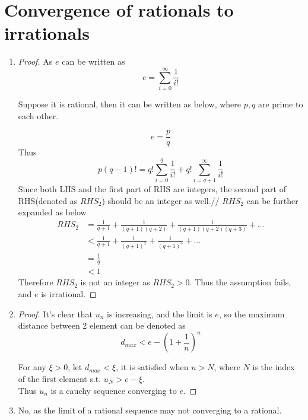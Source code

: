 \documentclass[paper=a4, fontsize=11pt]{scrartcl} %
\numberwithin{equation}{section} %
\numberwithin{figure}{section} %
\numberwithin{table}{section} %
\begin{document}
\section{Convergence of rationals to irrationals}
	\begin{enumerate}
		\item
			\begin{proof}
				As $e$ can be written as 
				\begin{equation}
					e = \sum_{i=0}^{\infty} \frac{1}{i!}
				\end{equation}
				
				Suppose it is rational, then it can be written as below, where $p, q$ are prime to each other.
				
				\begin{equation}
					e = \frac{p}{q} 
				\end{equation}
				Thus
				\begin{equation}
					p(q-1)! = q! \sum_{i=0}^{q} \frac{1}{i!} +  q! \sum_{i=q+1}^{\infty} \frac{1}{i!} 
				\end{equation}
				Since both LHS  and  the first part of RHS are integers, the second part of RHS(denoted as $RHS_2$) should be an integer as well.//
				$RHS_2$ can be further expanded as below
				\begin{equation}
					\begin{aligned}
						RHS_2 & = \frac{1}{q+1} + \frac{1}{(q+1)(q+2)} + \frac{1}{(q+1)(q+2)(q+3)} + ...\\
						           & <  \frac{1}{q+1} + \frac{1}{(q+1)^2} + \frac{1}{(q+1)^3} + ...\\
						           & = \frac{1}{q}\\
						           & < 1
					\end{aligned}
				\end{equation}
				Therefore $RHS_2$ is not an integer as $RHS_2 > 0$. Thus the assumption fails, and $e$  is irrational.
			\end{proof}
	
		\item
			\begin{proof}
				It's clear that $u_n$ is increasing, and the limit is $e$, so the maximum distance between 2 element can be denoted as 
				\begin{equation}
					d_{max} < e - (1+\frac{1}{n})^n
				\end{equation} 
				
				For any $\xi > 0$, let $d_{max} < \xi$, it is satisfied when $n > N $, where $N$ is the index of the first element s.t. $u_N > e-\xi$.\\
				Thus $u_n$ is a cauchy sequence converging to $e$.
			\end{proof}
		
		\item
			No, as the limit of a rational sequence may not converging to a rational.
	\end{enumerate}
\end{document}

